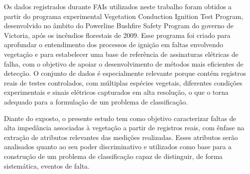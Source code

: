 Os dados registrados durante FAIs utilizados neste trabalho \cite{vic_bushfire_report} foram obtidos a partir do programa experimental Vegetation Conduction Ignition Test Program, desenvolvido no âmbito do Powerline Bushfire Safety Program do governo de Victoria, após os incêndios florestais de 2009. Esse programa foi criado para aprofundar o entendimento dos processos de ignição em faltas envolvendo vegetação e para estabelecer uma base de referência de assinaturas elétricas de falha, com o objetivo de apoiar o desenvolvimento de métodos mais eficientes de detecção. O conjunto de dados é especialmente relevante porque contém registros reais de testes controlados, com múltiplas espécies vegetais, diferentes condições experimentais e sinais elétricos capturados em alta resolução, o que o torna adequado para a formulação de um problema de classificação.

Diante do exposto, o presente estudo tem como objetivo caracterizar faltas de alta impedância associadas à vegetação a partir de registros reais, com ênfase na extração de atributos relevantes das medições realizadas. Esses atributos serão analisados quanto ao seu poder discriminativo e utilizados como base para a construção de um problema de classificação capaz de distinguir, de forma sistemática, eventos de falta.
